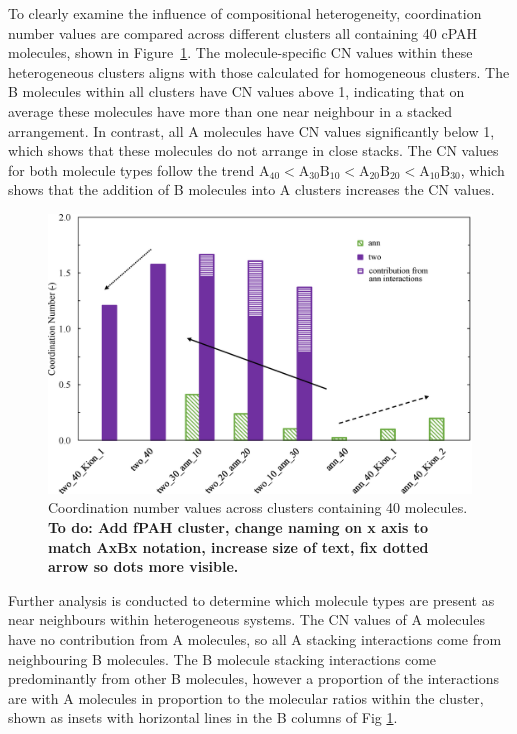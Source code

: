 To clearly examine the influence of compositional heterogeneity, coordination number values are compared across different clusters all containing 40 cPAH molecules, shown in Figure~\ref{fig:coordination_numbers}. The molecule-specific CN values within these heterogeneous clusters aligns with those calculated for homogeneous clusters. The B molecules within all clusters have CN values above 1, indicating that on average these molecules have more than one near neighbour in a stacked arrangement. In contrast, all A molecules have CN values significantly below 1, which shows that these molecules do not arrange in close stacks.  
The CN values for both molecule types follow the trend $\text{A}_{\text{40}} < \text{A}_{\text{30}}\text{B}_{\text{10}} < \text{A}_{\text{20}}\text{B}_{\text{20}} < \text{A}_{\text{10}}\text{B}_{\text{30}}$, which shows that the addition of B molecules into A clusters increases the CN values.
%
\begin{figure}[!bth]
\centering
\includegraphics[width=0.8\linewidth]{Figures/CN_bar_chart.eps}
\caption{Coordination number values across clusters containing 40 molecules. \textbf{To do: Add fPAH cluster, change naming on x axis to match AxBx notation, increase size of text, fix dotted arrow so dots more visible.}}
\label{fig:coordination_numbers}
\end{figure}
%

Further analysis is conducted to determine which molecule types are present as near neighbours within heterogeneous systems. The CN values of A molecules have no contribution from A molecules, so all A stacking interactions come from neighbouring B molecules. The B molecule stacking interactions come predominantly from other B molecules, however a proportion of the interactions are with A molecules in proportion to the molecular ratios within the cluster, shown as insets with horizontal lines in the B columns of Fig \ref{fig:coordination_numbers}.
%

